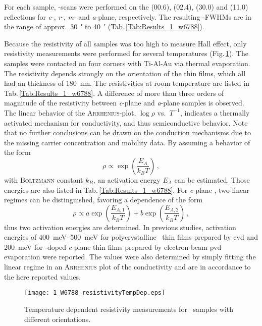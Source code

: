 For each sample, \textomega-scans were performed on the (00.6), (02.4), (30.0) and (11.0) reflections for \textit{c}-, \textit{r}-, \textit{m}- and \textit{a}-plane, respectively.
The resulting \textomega-FWHMs are in the range of approx.\ \qty{30}{\arcminute} to \qty{40}{\arcminute} (Tab.\,\ref{Tab:Results_1_w6788}).

Because the resistivity of all samples was too high to measure Hall effect, only resistivity measurements were performed for several temperatures (Fig.\,\ref{Fig:Results_1_w6788_TdH}).
The samples were contacted on four corners with Ti-Al-Au via thermal evaporation.
The resistivity depends strongly on the orientation of the thin films, which all had an thickness of \qty{180}{\nm}.
The resistivities at room temperature are listed in Tab.\,\ref{Tab:Results_1_w6788}.
A difference of more than three orders of magnitude of the resistivity between \textit{c}-plane and \textit{a}-plane samples is observed.
The linear behavior of the \textsc{Arrhenius}-plot, $\log\rho$ vs.\ $T^{-1}$, indicates a thermally activated mechanism for conductivity, and thus semiconductive behavior.
Note that no further conclusions can be drawn on the conduction mechanisms due to the missing carrier concentration and mobility data.
By assuming a behavior of the form
\begin{equation}
    \label{Equ:Results_1_Arrhenius}
    \rho\propto\exp\left(\frac{E_A}{k_BT}\right)\,,
\end{equation}
with \textsc{Boltzmann} constant $k_B$, an activation energy $E_A$ can be estimated.
Those energies are also listed in Tab.\,\ref{Tab:Results_1_w6788}.
For \textit{c}-plane \cro, two linear regimes can be distinguished, favoring a dependence of the form
\begin{equation}
    \label{Equ:Results_1_Arrhenius2}
    \rho\propto a\exp\left(\frac{E_{A,1}}{k_BT}\right)
    +b\exp\left(\frac{E_{A,2}}{k_BT}\right)\,,
\end{equation}
thus two activation energies are determined.
In previous studies, activation energies of \qtyrange{400}{500}{\milli\eV} for polycrystalline \cro\ thin films prepared by \gls{cvd}
    \cite{cheng1996}
and \qty{200}{\milli\eV} for -doped \textit{c}-plane thin films prepared by electron beam \gls{pvd} evaporation
    \cite{farrell2015}
were reported.
The values were also determined by simply fitting the linear regime in an \textsc{Arrhenius} plot of the conductivity and are in accordance to the here reported values.
\begin{figure}
    \centering
    \texttt{[image: 1\_W6788\_resistivityTempDep.eps]}
    \caption{
        Temperature dependent resistivity measurements for \cro\ samples with different orientations.
    }
    \label{Fig:Results_1_w6788_TdH}
\end{figure}